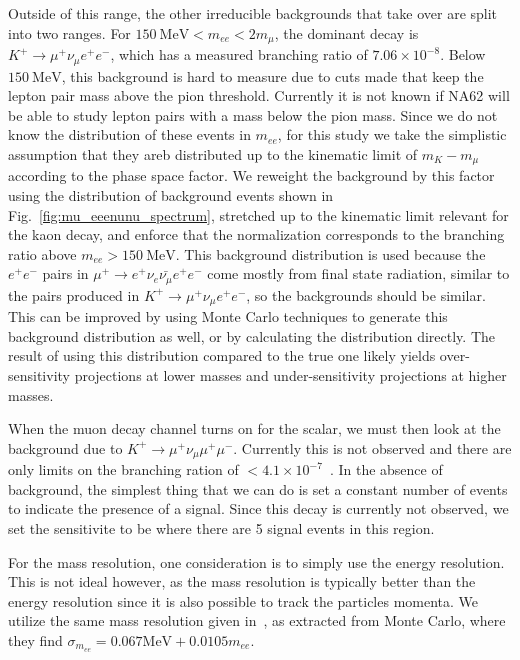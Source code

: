 Outside of this range, the other irreducible backgrounds that take over are split into two ranges.
For $150~\textrm{MeV} < m_{ee} < 2m_\mu$, the dominant decay is $K^+ \rightarrow \mu^+ \nu_\mu e^+ e^-$, which has a measured branching ratio of $7.06 \times 10^{-8}$.
Below $150~\textrm{MeV}$, this background is hard to measure due to cuts made that keep the lepton pair mass above the pion threshold.
Currently it is not known if NA62 will be able to study lepton pairs with a mass below the pion mass.
Since we do not know the distribution of these events in $m_{ee}$, for this study we take the simplistic assumption that they areb distributed up to the kinematic limit of $m_K - m_\mu$ according to the phase space factor.
We reweight the background by this factor using the distribution of background events shown in Fig.~\ref{fig:mu_eeenunu_spectrum}, stretched up to the kinematic limit relevant for the kaon decay, and enforce that the normalization corresponds to the branching ratio above $m_{ee} > 150~\textrm{MeV}$.
This background distribution is used because the $e^+ e^-$ pairs in $\mu^+ \rightarrow e^+ \nu_e \bar{\nu_\mu} e^+ e^-$ come mostly from final state radiation, similar to the pairs produced in $K^+ \rightarrow \mu^+ \nu_\mu e^+ e^-$, so the backgrounds should be similar.
This can be improved by using Monte Carlo techniques to generate this background distribution as well, or by calculating the distribution directly.
The result of using this distribution compared to the true one likely yields over-sensitivity projections at lower masses and under-sensitivity projections at higher masses.

When the muon decay channel turns on for the scalar, we must then look at the background due to $K^+ \rightarrow \mu^+ \nu_\mu \mu^+ \mu^-$.
Currently this is not observed and there are only limits on the branching ration of $< 4.1 \times 10^{-7}$~\cite{Agashe:2014kda}.
In the absence of background, the simplest thing that we can do is set a constant number of events to indicate the presence of a signal.
Since this decay is currently not observed, we set the sensitivite to be where there are 5 signal events in this region.

For the mass resolution, one consideration is to simply use the energy resolution.
This is not ideal however, as the mass resolution is typically better than the energy resolution since it is also possible to track the particles momenta.
We utilize the same mass resolution given in~\cite{Batley:2015lha}, as extracted from Monte Carlo, where they find $\sigma_{m_{ee}} = 0.067\textrm{MeV} + 0.0105 m_{ee}$.

